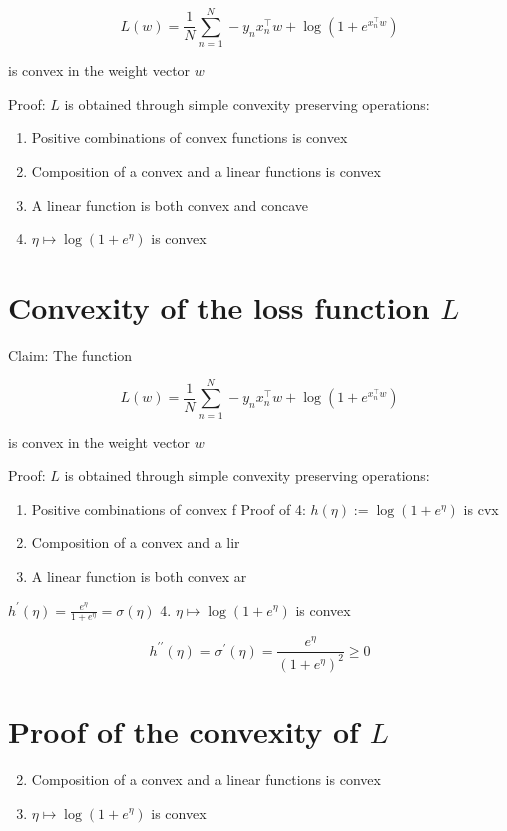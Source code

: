 \documentclass[10pt]{article}
\begin{document}
$$
L(w)=\frac{1}{N} \sum_{n=1}^{N}-y_{n} x_{n}^{\top} w+\log \left(1+e^{x_{n}^{\top} w}\right)
$$

is convex in the weight vector $w$

Proof: $L$ is obtained through simple convexity preserving operations:

\begin{enumerate}
  \item Positive combinations of convex functions is convex

  \item Composition of a convex and a linear functions is convex

  \item A linear function is both convex and concave

  \item $\eta \mapsto \log \left(1+e^{\eta}\right)$ is convex

\end{enumerate}

\section*{Convexity of the loss function $L$}
Claim: The function

$$
L(w)=\frac{1}{N} \sum_{n=1}^{N}-y_{n} x_{n}^{\top} w+\log \left(1+e^{x_{n}^{\top} w}\right)
$$

is convex in the weight vector $w$

Proof: $L$ is obtained through simple convexity preserving operations:

\begin{enumerate}
  \item Positive combinations of convex f Proof of 4: $h(\eta):=\log \left(1+e^{\eta}\right)$ is cvx

  \item Composition of a convex and a lir

  \item A linear function is both convex ar

\end{enumerate}

$h^{\prime}(\eta)=\frac{e^{\eta}}{1+e^{\eta}}=\sigma(\eta)$
4. $\eta \mapsto \log \left(1+e^{\eta}\right)$ is convex

$$
h^{\prime \prime}(\eta)=\sigma^{\prime}(\eta)=\frac{e^{\eta}}{\left(1+e^{\eta}\right)^{2}} \geq 0
$$

\section*{Proof of the convexity of $L$}
\begin{enumerate}
  \setcounter{enumi}{1}
  \item Composition of a convex and a linear functions is convex
  \item $\eta \mapsto \log \left(1+e^{\eta}\right)$ is convex
\end{enumerate}
\end{document}
